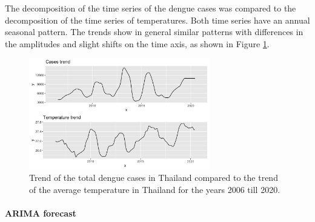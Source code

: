 	The decomposition of the time series of the dengue cases was compared to the decomposition of the time series of temperatures. Both time series have an annual seasonal pattern. The trends show in general similar patterns with differences in the amplitudes and slight shifts on the time axis, as shown in Figure \ref{fig:Trend_temp_cases}.
	\begin{figure}[hbpt] 
		\centering
		\includegraphics[width=0.7\textwidth]{fig/Trend_temp_cases.png}
		\caption{Trend of the total dengue cases in Thailand compared to the trend of the average temperature in Thailand for the years 2006 till 2020.}
		\label{fig:Trend_temp_cases}
	\end{figure}
	
	\paragraph{ARIMA forecast}
	
